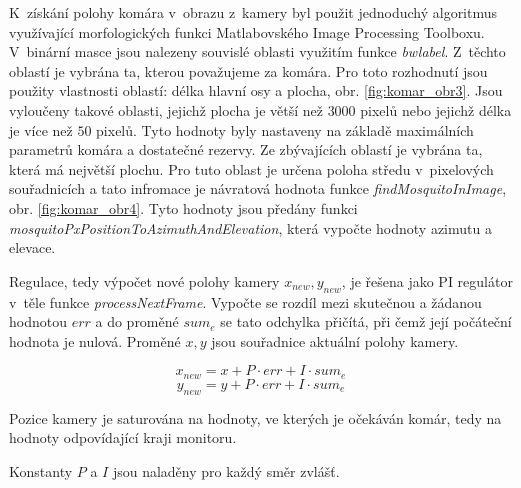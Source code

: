 \documentclass[a4paper,10pt]{article}
\begin{document}
		K~získání polohy komára v~obrazu z~kamery byl použit jednoduchý algoritmus
		využívající morfologických funkci Matlabovského Image Processing Toolboxu. 
		V~binární masce jsou nalezeny souvislé oblasti využitím funkce \textit{bwlabel}.
		Z~těchto oblastí je vybrána ta, kterou považujeme za komára. Pro toto
		rozhodnutí jsou použity vlastnosti oblastí: délka hlavní osy a plocha, obr. \ref{fig:komar_obr3}.
		Jsou vyloučeny takové oblasti, jejichž plocha je větší než $3000$
		pixelů nebo jejichž délka je více než $50$ pixelů. Tyto hodnoty byly nastaveny
		na základě maximálních parametrů komára a dostatečné rezervy. Ze zbývajících
		oblastí je vybrána ta, která má největší plochu. Pro tuto oblast je určena
		poloha středu v~pixelových souřadnicích a tato infromace je návratová hodnota
		funkce \textit{findMosquitoInImage}, obr. \ref{fig:komar_obr4}.
		Tyto hodnoty jsou předány funkci \textit{mosquitoPxPositionToAzimuthAndElevation},
		která vypočte hodnoty azimutu a elevace. 

	        Regulace, tedy výpočet nové polohy kamery $x_{new}, y_{new}$, je řešena jako PI
		regulátor v~těle funkce \textit{processNextFrame}. 
	        Vypočte se rozdíl mezi skutečnou a žádanou hodnotou $err$ a do
		proměné $sum_e$ se tato odchylka přičítá, při čemž její počáteční hodnota je
		nulová. Proměné $x, y$ jsou souřadnice aktuální polohy kamery.

		$$x_{new} = x + P\cdot err + I\cdot sum_e$$
		$$y_{new} = y + P\cdot err + I\cdot sum_e$$

		Pozice kamery je saturována na hodnoty, ve
		kterých je očekáván komár, tedy na hodnoty odpovídající kraji monitoru.

		Konstanty $P$ a $I$ jsou naladěny pro každý směr zvlášť.
		



\end{document}
